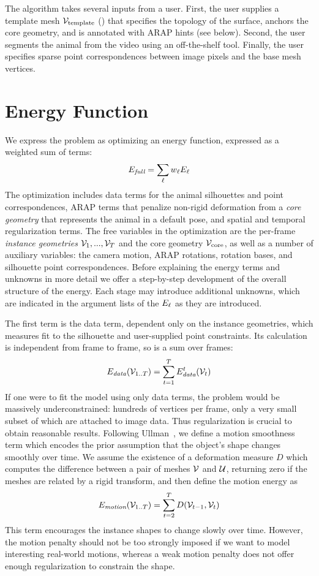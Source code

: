 \documentclass[preprint]{acmsiggraph}
\begin{document}
The algorithm takes several inputs from a user.
First, the user supplies a template mesh $\mathcal{V}_{\text{template}}$ () that specifies the topology of the
surface, anchors the core geometry, and is annotated
with ARAP hints (see below). Second, the user segments the animal
from the video using an off-the-shelf tool. Finally, the user 
specifies sparse point correspondences between image pixels and the
base mesh vertices.


\section{Energy Function}
\label{sec:energy}
We express the problem as optimizing an energy function, expressed as
a weighted sum of terms:
\begin{equation}
E_{\text{\em full}} = \sum_{\ell} w_{\text{\em $\ell$}} E_{\text{\em $\ell$}}
\label{eq:Efull}
\end{equation}
The optimization includes data terms for the animal silhouettes and
point correspondences, ARAP terms that penalize non-rigid deformation
from a \textit{core geometry} that represents the animal in a default
pose, and spatial and temporal regularization terms.
The free variables in the optimization are the per-frame {\em instance geometries}
$\mathcal{V}_1, ..., \mathcal{V}_T$ and the core geometry $\mathcal{V}_{\text{core}}$, as well as a number of
auxiliary variables: the camera motion, ARAP rotations, rotation
bases, and silhouette point correspondences.   Before explaining the energy terms and unknowns in more detail we offer a step-by-step development of the overall structure of the energy.  Each stage may introduce additional unknowns, which are indicated in the argument lists of the \(E_{\text{\em $\ell$}}\) as they are introduced.

\def\ED{D}
The first term is the data term, dependent only on the instance geometries, which measures fit to the silhouette and user-supplied point constraints.  Its calculation is independent from frame to frame, so is a sum over frames:
\begin{equation}
E_{\text{\em data}}(\mathcal{V}_{1..T}) = \sum_{t=1}^T E_{\text{\em data}}^t(\mathcal{V}_t)
\label{eq:Edata0}
\end{equation}
If one were to fit the model using only data terms, the problem would be massively underconstrained: hundreds of vertices per frame, only a very small subset of which are attached to image data.
Thus regularization is crucial to obtain reasonable results.   Following Ullman~, we define a motion smoothness term which encodes the prior assumption that the object's shape changes smoothly over time.  We assume the existence of a deformation measure $\ED$ which computes the difference between a pair of meshes $\mathcal{V}$ and $\mathcal{U}$, returning zero if the meshes are related by a rigid transform, and then define the motion energy as
\begin{equation}
\E{motion}(\cV_{1..T}) = \sum_{t=2}^T \ED(\cV_{t-1},\cV_t)
\label{eq:Emotion0}
\end{equation}
This term encourages the instance shapes to change slowly over time.  However, the motion penalty should not be too strongly imposed if we want to model interesting real-world motions, whereas a weak motion penalty does not offer enough regularization to constrain the shape.
\end{document}
